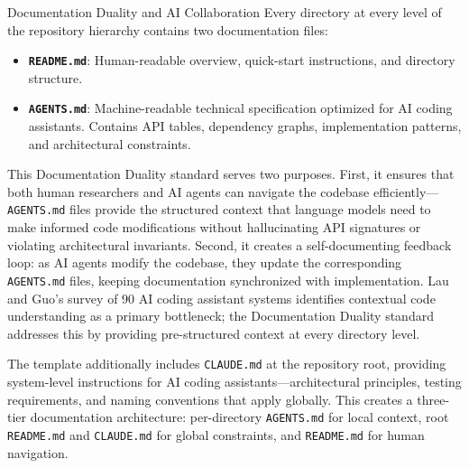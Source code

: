 \documentclass[
  ignorenonframetext,
]{beamer}
\author{\texorpdfstring{}{}}
\date{}
\providecommand{\tightlist}{%
  \setlength{\itemsep}{0pt}\setlength{\parskip}{0pt}}
\begin{document}
\begin{frame}{Documentation Duality and AI
Collaboration}
\protect{}\label{documentation-duality-and-ai-collaboration}
Every directory at every level of the repository hierarchy contains two
documentation files:

\begin{itemize}
\tightlist
\item
  \textbf{\texttt{README.md}}: Human-readable overview, quick-start
  instructions, and directory structure.
\item
  \textbf{\texttt{AGENTS.md}}: Machine-readable technical specification
  optimized for AI coding assistants. Contains API tables, dependency
  graphs, implementation patterns, and architectural constraints.
\end{itemize}

This Documentation Duality standard serves two purposes. First, it
ensures that both human researchers and AI agents can navigate the
codebase efficiently---\texttt{AGENTS.md} files provide the structured
context that language models need to make informed code modifications
without hallucinating API signatures or violating architectural
invariants. Second, it creates a self-documenting feedback loop: as AI
agents modify the codebase, they update the corresponding
\texttt{AGENTS.md} files, keeping documentation synchronized with
implementation. Lau and Guo's survey of 90 AI coding assistant systems
 identifies contextual code understanding as a
primary bottleneck; the Documentation Duality standard addresses this by
providing pre-structured context at every directory level.

The template additionally includes \texttt{CLAUDE.md} at the repository
root, providing system-level instructions for AI coding
assistants---architectural principles, testing requirements, and naming
conventions that apply globally. This creates a three-tier documentation
architecture: per-directory \texttt{AGENTS.md} for local context, root
\texttt{README.md} and \texttt{CLAUDE.md} for global constraints, and
\texttt{README.md} for human navigation.
\end{frame}
\end{document}
